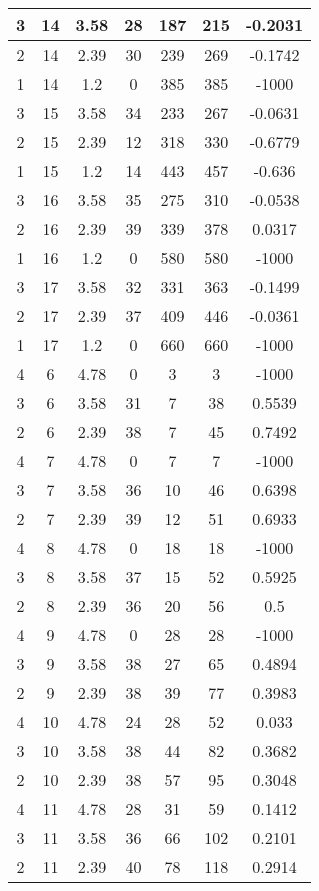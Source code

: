 \documentclass[letterpaper, 12pt]{article}
\begin{document}
\begin{longtable}{|c|c|c|c|c|c|c|}
\hline
3 & 14 & 3.58 & 28 & 187 & 215 & -0.2031 \\
\hline
2 & 14 & 2.39 & 30 & 239 & 269 & -0.1742 \\
\hline
1 & 14 & 1.2 & 0 & 385 & 385 & -1000 \\
\hline
3 & 15 & 3.58 & 34 & 233 & 267 & -0.0631 \\
\hline
2 & 15 & 2.39 & 12 & 318 & 330 & -0.6779 \\
\hline
1 & 15 & 1.2 & 14 & 443 & 457 & -0.636 \\
\hline
3 & 16 & 3.58 & 35 & 275 & 310 & -0.0538 \\
\hline
2 & 16 & 2.39 & 39 & 339 & 378 & 0.0317 \\
\hline
1 & 16 & 1.2 & 0 & 580 & 580 & -1000 \\
\hline
3 & 17 & 3.58 & 32 & 331 & 363 & -0.1499 \\
\hline
2 & 17 & 2.39 & 37 & 409 & 446 & -0.0361 \\
\hline
1 & 17 & 1.2 & 0 & 660 & 660 & -1000 \\
\hline
4 & 6 & 4.78 & 0 & 3 & 3 & -1000 \\
\hline
3 & 6 & 3.58 & 31 & 7 & 38 & 0.5539 \\
\hline
2 & 6 & 2.39 & 38 & 7 & 45 & 0.7492 \\
\hline
4 & 7 & 4.78 & 0 & 7 & 7 & -1000 \\
\hline
3 & 7 & 3.58 & 36 & 10 & 46 & 0.6398 \\
\hline
2 & 7 & 2.39 & 39 & 12 & 51 & 0.6933 \\
\hline
4 & 8 & 4.78 & 0 & 18 & 18 & -1000 \\
\hline
3 & 8 & 3.58 & 37 & 15 & 52 & 0.5925 \\
\hline
2 & 8 & 2.39 & 36 & 20 & 56 & 0.5 \\
\hline
4 & 9 & 4.78 & 0 & 28 & 28 & -1000 \\
\hline
3 & 9 & 3.58 & 38 & 27 & 65 & 0.4894 \\
\hline
2 & 9 & 2.39 & 38 & 39 & 77 & 0.3983 \\
\hline
4 & 10 & 4.78 & 24 & 28 & 52 & 0.033 \\
\hline
3 & 10 & 3.58 & 38 & 44 & 82 & 0.3682 \\
\hline
2 & 10 & 2.39 & 38 & 57 & 95 & 0.3048 \\
\hline
4 & 11 & 4.78 & 28 & 31 & 59 & 0.1412 \\
\hline
3 & 11 & 3.58 & 36 & 66 & 102 & 0.2101 \\
\hline
2 & 11 & 2.39 & 40 & 78 & 118 & 0.2914 \\

\end{longtable}
\end{document}

